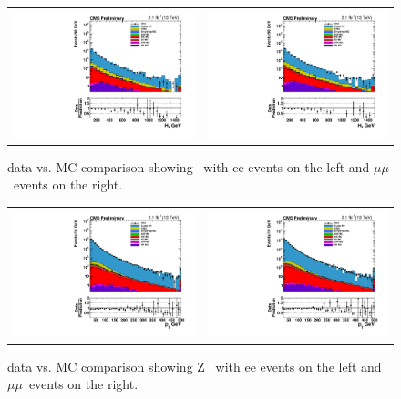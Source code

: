 \begin{figure}[!ht]
  \begin{center}
    \begin{tabular}{cc}
      \includegraphics[width=0.4\linewidth]{evtsel/figs/h_ht_highbin_ee_signalregion_inclusive_passtrig.pdf} &
      \includegraphics[width=0.4\linewidth]{evtsel/figs/h_ht_highbin_mm_signalregion_inclusive_passtrig.pdf} \\
    \end{tabular}
    \caption{
      \label{fig:datavsmc_ht}
      data vs. MC comparison showing \HT\ with ee events on the left and $\mu\mu$~events on the right.
    }
  \end{center}
\end{figure}

\begin{figure}[!ht]
  \begin{center}
    \begin{tabular}{cc}
      \includegraphics[width=0.4\linewidth]{evtsel/figs/h_ptdil_ee_signalregion_inclusive_passtrig.pdf} &
      \includegraphics[width=0.4\linewidth]{evtsel/figs/h_ptdil_mm_signalregion_inclusive_passtrig.pdf} \\
    \end{tabular}
    \caption{
      \label{fig:datavsmc_ptdil}
      data vs. MC comparison showing Z \pt\ with ee events on the left and $\mu\mu$~events on the right.
    }
  \end{center}
\end{figure}


